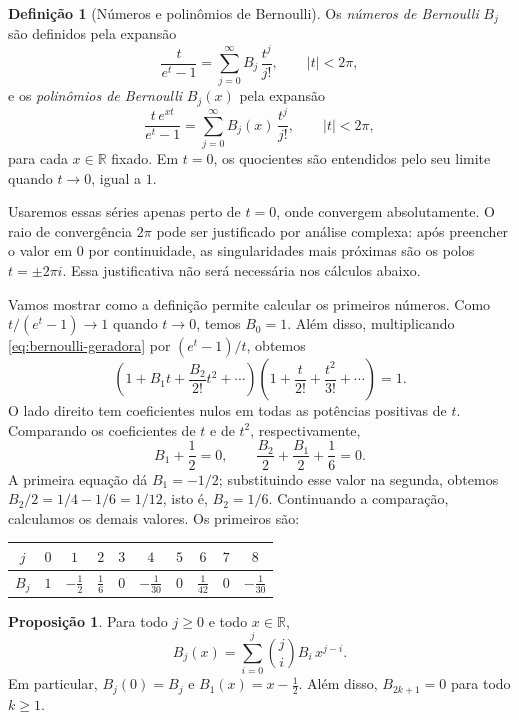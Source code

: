 \documentclass[12pt,portuguese]{article}
\theoremstyle{definition}
\newtheorem{definition}[definition]{Definição}
\newtheorem{proposition}[proposition]{Proposição}
\theoremstyle{plainexercise}
\theoremstyle{starredexercise}
\theoremstyle{definition}
\begin{document}
\begin{definition}[Números e polinômios de Bernoulli]\label{def:bernoulli}
Os \emph{números de Bernoulli} $B_j$ são definidos pela expansão
\begin{equation}\label{eq:bernoulli-geradora}
\frac{t}{e^{t}-1}=\sum_{j=0}^{\infty}B_j\,\frac{t^j}{j!},
\qquad |t|<2\pi,
\end{equation}
e os \emph{polinômios de Bernoulli} $B_j(x)$ pela expansão
\begin{equation}\label{eq:bernoulli-polinomios}
\frac{t\,e^{xt}}{e^{t}-1}=\sum_{j=0}^{\infty}B_j(x)\,\frac{t^j}{j!},
\qquad |t|<2\pi,
\end{equation}
para cada $x\in\mathbb{R}$ fixado. Em $t=0$, os quocientes são
entendidos pelo seu limite quando $t\to0$, igual a $1$.
\end{definition}

Usaremos essas séries apenas perto de $t=0$, onde convergem
absolutamente. O raio de convergência $2\pi$ pode ser justificado por
análise complexa: após preencher o valor em $0$ por continuidade, as
singularidades mais próximas são os polos $t=\pm2\pi i$. Essa
justificativa não será necessária nos cálculos abaixo.

Vamos mostrar como a definição permite calcular os primeiros números.
Como $t/(e^t-1)\to1$ quando $t\to0$, temos $B_0=1$.
Além disso, multiplicando
\eqref{eq:bernoulli-geradora} por $(e^t-1)/t$, obtemos
\[
\left(1+B_1t+\frac{B_2}{2!}t^2+\cdots\right)
\left(1+\frac{t}{2!}+\frac{t^2}{3!}+\cdots\right)=1.
\]
O lado direito tem coeficientes nulos em todas as potências positivas
de $t$. Comparando os coeficientes de $t$ e de $t^2$, respectivamente,
\[
B_1+\frac12=0,
\qquad
\frac{B_2}{2}+\frac{B_1}{2}+\frac16=0.
\]
A primeira equação dá $B_1=-1/2$; substituindo esse valor na segunda,
obtemos $B_2/2=1/4-1/6=1/12$, isto é, $B_2=1/6$.
Continuando a comparação, calculamos os demais valores. Os primeiros são:
\begin{center}
\begin{tabular}{c|ccccccccc}
\toprule
$j$ & $0$ & $1$ & $2$ & $3$ & $4$ & $5$ & $6$ & $7$ & $8$\\
\midrule
$B_j$ & $1$ & $-\tfrac12$ & $\tfrac16$ & $0$ & $-\tfrac1{30}$ & $0$
& $\tfrac1{42}$ & $0$ & $-\tfrac1{30}$\\
\bottomrule
\end{tabular}
\end{center}

\begin{proposition}\label{prop:bernoulli}
Para todo $j\geqslant0$ e todo $x\in\mathbb{R}$,
\begin{equation}\label{eq:bernoulli-explicito}
B_j(x)=\sum_{i=0}^{j}\binom{j}{i}B_i\,x^{j-i}.
\end{equation}
Em particular, $B_j(0)=B_j$ e $B_1(x)=x-\tfrac12$. Além disso,
$B_{2k+1}=0$ para todo $k\geqslant1$.
\end{proposition}
\end{document}
